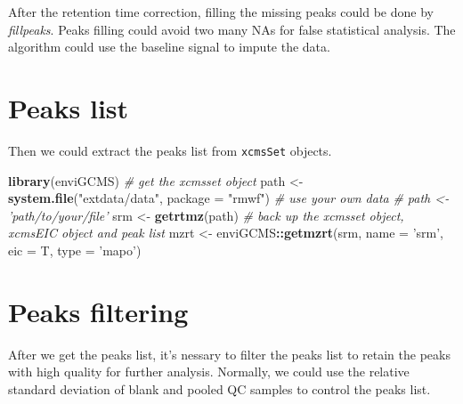 \documentclass[
]{book}
\newenvironment{Shaded}{\begin{snugshade}}{\end{snugshade}}
\newcommand{\CommentTok}[1]{\textcolor[rgb]{0.56,0.35,0.01}{\textit{#1}}}
\newcommand{\DataTypeTok}[1]{\textcolor[rgb]{0.13,0.29,0.53}{#1}}
\newcommand{\KeywordTok}[1]{\textcolor[rgb]{0.13,0.29,0.53}{\textbf{#1}}}
\newcommand{\NormalTok}[1]{#1}
\newcommand{\OperatorTok}[1]{\textcolor[rgb]{0.81,0.36,0.00}{\textbf{#1}}}
\newcommand{\StringTok}[1]{\textcolor[rgb]{0.31,0.60,0.02}{#1}}
\begin{document}
After the retention time correction, filling the missing peaks could be done by \emph{fillpeaks}. Peaks filling could avoid two many NAs for false statistical analysis. The algorithm could use the baseline signal to impute the data.

\hypertarget{peaks-list}{%
\section{Peaks list}\label{peaks-list}}

Then we could extract the peaks list from \texttt{xcmsSet} objects.

\begin{Shaded}
\begin{Highlighting}[]
\KeywordTok{library}\NormalTok{(enviGCMS)}
\CommentTok{# get the xcmsset object}
\NormalTok{path <-}\StringTok{ }\KeywordTok{system.file}\NormalTok{(}\StringTok{"extdata/data"}\NormalTok{, }\DataTypeTok{package =} \StringTok{"rmwf"}\NormalTok{)}
\CommentTok{# use your own data}
\CommentTok{# path <- 'path/to/your/file'}
\NormalTok{srm <-}\StringTok{ }\KeywordTok{getrtmz}\NormalTok{(path)}
\CommentTok{# back up the xcmsset object, xcmsEIC object and peak list}
\NormalTok{mzrt <-}\StringTok{ }\NormalTok{enviGCMS}\OperatorTok{::}\KeywordTok{getmzrt}\NormalTok{(srm, }\DataTypeTok{name =} \StringTok{'srm'}\NormalTok{, }\DataTypeTok{eic =}\NormalTok{ T, }\DataTypeTok{type =} \StringTok{'mapo'}\NormalTok{)}
\end{Highlighting}
\end{Shaded}

\hypertarget{peaks-filtering}{%
\section{Peaks filtering}\label{peaks-filtering}}

After we get the peaks list, it's nessary to filter the peaks list to retain the peaks with high quality for further analysis. Normally, we could use the relative standard deviation of blank and pooled QC samples to control the peaks list.
\end{document}
